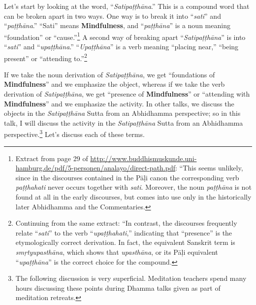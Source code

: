 Let’s start by looking at the word, “\textit{Satipaṭṭhāna}.” This is a compound word that can be broken apart in two ways. One way is to break it into “\textit{sati}” and “\textit{paṭṭhāna}.” “Sati” means \textbf{Mindfulness}, and “\textit{paṭṭhāna}” is a noun meaning “foundation” or “cause.”\footnote{Extract from page 29 of \url{http://www.buddhismuskunde.uni-hamburg.de/pdf/5-personen/analayo/direct-path.pdf}: “This seems unlikely, since in the discourses contained in the Pāḷi canon the corresponding verb \textit{paṭṭhahati} never occurs together with \textit{sati}. Moreover, the noun \textit{paṭṭhāna} is not found at all in the early discourses, but comes into use only in the historically later Abhidhamma and the Commentaries.} A second way of breaking apart “\textit{Satipaṭṭhāna}” is into “\textit{sati}” and “\textit{upaṭṭhāna}.” “\textit{Upaṭṭhāna}” is a verb meaning “placing near,” “being present” or “attending to.”\footnote{Continuing from the same extract: “In contrast, the discourses frequently relate “\textit{sati}” to the verb “\textit{upaṭṭhahati},” indicating that “presence” is the etymologically correct derivation. In fact, the equivalent Sanskrit term is \textit{smṛtyupasthāna}, which shows that \textit{upasthāna}, or its Pāḷi equivalent “\textit{upaṭṭhāna}” is the correct choice for the compound.}

If we take the noun derivation of \textit{Satipaṭṭhāna}, we get “foundations of \textbf{Mindfulness}” and we emphasize the object, whereas if we take the verb derivation of \textit{Satipaṭṭhāna}, we get “presence of \textbf{Mindfulness}” or “attending with \textbf{Mindfulness}” and we emphasize the activity. In other talks, we discuss the objects in the \textit{Satipaṭṭhāna} Sutta from an Abhidhamma perspective; so in this talk, I will discuss the activity in the \textit{Satipaṭṭhāna} Sutta from an Abhidhamma perspective.\footnote{The following discussion is very superficial. Meditation teachers spend many hours discussing these points during Dhamma talks given as part of meditation retreats.} Let’s discuss each of these terms.

